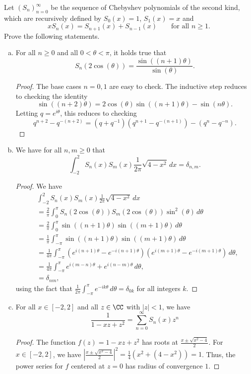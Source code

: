 \documentclass{article}
\begin{document}
   Let $(S_n)_{n=0}^\infty$ be the sequence of Chebyshev polynomials of the second kind, which are recursively defined by $S_0(x) = 1$, $S_1(x) = x$ and
  $$x S_n(x) = S_{n+1}(x) + S_{n-1}(x) \qquad \text{for all } n \ge 1.$$
  Prove the following statements.
  \begin{enumerate}[(a)]
  \item  For all $n \ge 0$ and all $0 < \theta < \pi$, it holds true that
    $$S_n( 2 \cos(\theta)) = \frac{\sin((n+1) \theta)}{\sin(\theta)}.$$
    \begin{proof}
      The base cases $n = 0,1$ are easy to check.  The inductive step reduces to
      checking the identity
      $$\sin((n+2) \theta) = 2 \cos(\theta) \sin((n+1) \theta) - \sin(n \theta).$$
      Letting $q = e^{i \theta}$, this reduces to checking
      $$ q^{n+2} - q^{-(n+2)} = (q + q^{-1}) (q^{n+1} - q^{-(n+1)}) - (q^{n} - q^{-n}).$$
    \end{proof}

  \item We have for all $n, m \ge 0$ that
    $$ \int_{-2}^2 S_n(x) S_m(x) \frac{1}{2\pi}  \sqrt{4 - x^2} \, dx = \delta_{n,m}. $$
    \begin{proof}
      We have
      \begin{align*}
        & \int_{-2}^2 S_n(x) S_m(x) \frac{1}{2\pi}  \sqrt{4 - x^2} \, dx \\
        & = \frac{2}{\pi}\int_{0}^\pi S_n(2 \cos(\theta)) S_m(2 \cos(\theta)) \sin^2(\theta) \, d \theta   \\
        & = \frac{2}{\pi} \int_{0}^\pi {\sin((n+1)\theta) \sin((m+1)\theta)} \, d \theta \\
        & = \frac{1}{\pi} \int_{-\pi}^\pi {\sin((n+1)\theta) \sin((m+1)\theta)} \, d \theta \\
        & = \frac{1}{4\pi} \int_{-\pi}^\pi  (e^{i(n+1) \theta} - e^{-i(n+1) \theta}) (e^{i(m+1) \theta} - e^{-i(m+1) \theta})\, d \theta, \\
        & = \frac{1}{4\pi} \int_{-\pi}^\pi  e^{i(m-n)\theta} + e^{i(n-m) \theta}\, d \theta, \\
        & = \delta_{nm},
      \end{align*}
      using the fact that $\frac{1}{2\pi} \int_{-\pi}^\pi e^{-ik\theta} \, d\theta = \delta_{0k}$ for all integers $k$.      
    \end{proof}
  \item For all $x \in [-2, 2]$ and all $z \in \CC$ with $|z| < 1$, we have
    $$ \frac{1}{1 - xz + z^2}  = \sum_{n=0}^\infty S_n(x) z^n$$
    \begin{proof}
      The function $f(z) = 1 - xz + z^2$ has roots at
      $\frac{x \pm \sqrt{x^2 - 4}}{2}$.  For $x \in [-2,2]$, we have
      $\left| \frac{x \pm \sqrt{x^2 - 4}}{2} \right|^2 = \frac{1}{4} \left(x^2      + (4- x^2) \right) = 1$.  Thus,  the power series for $f$ centered at $z = 0$ has radius of convergence $1$.


\end{proof}
\end{enumerate}
\end{document}
